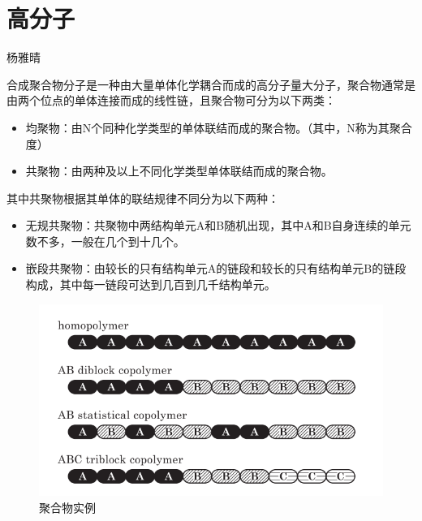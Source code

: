 \section{高分子}
{\color{red}\begin{center}
        杨雅晴
    \end{center}}
合成聚合物分子是一种由大量单体化学耦合而成的高分子量大分子，聚合物通常是由两个位点的单体连接而成的线性链，且聚合物可分为以下两类：
\begin{itemize}
	\item 均聚物：由N个同种化学类型的单体联结而成的聚合物。（其中，N称为其聚合度）
	\item 共聚物：由两种及以上不同化学类型单体联结而成的聚合物。
\end{itemize}
其中共聚物根据其单体的联结规律不同分为以下两种：
\begin{itemize}
	\item 无规共聚物：共聚物中两结构单元A和B随机出现，其中A和B自身连续的单元数不多，一般在几个到十几个。
	\item 嵌段共聚物：由较长的只有结构单元A的链段和较长的只有结构单元B的链段构成，其中每一链段可达到几百到几千结构单元。
\end{itemize}

\begin{figure}[h]
	\centering
	\includegraphics[scale=0.5
    ]{Contents/chapter1/figures/1-1.png}
	\caption{聚合物实例}
\end{figure}

